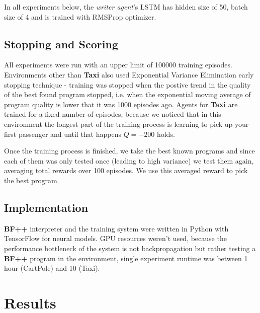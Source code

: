 In all experiments below, the \emph{writer agent}'s LSTM has hidden size of 50, batch size of 4 and is trained with RMSProp \cite{rmsprop} optimizer.

\subsection{Stopping and Scoring}

All experiments were run with an upper limit of 100000 training episodes.
Environments other than \textbf{Taxi} also used Exponential Variance Elimination \cite{evestop} early stopping technique - training was stopped when the postive trend in the quality of the best found program stopped, i.e. when the exponential moving average of program quality is lower that it was 1000 episodes ago.
Agents for \textbf{Taxi} are trained for a fixed number of episodes, because we noticed that in this environment the longest part of the training process is learning to pick up your first passenger and until that happens $Q=-200$ holds.

Once the training process is finished, we take the best known programs and since each of them was only tested once (leading to high variance) we test them again, averaging total rewards over 100 episodes. 
We use this averaged reward to pick the best program.

\subsection{Implementation}

\textbf{BF++} interpreter and the training system were written in Python with TensorFlow for neural models.
GPU resources weren't used, because the performance bottleneck of the system is not backpropagation but rather testing a \textbf{BF++} program in the environment, single experiment runtime was between 1 hour (CartPole) and 10 (Taxi).


\section{Results}

